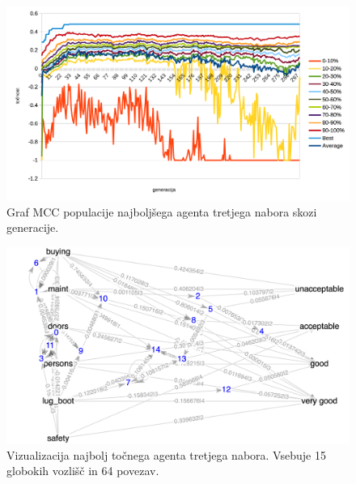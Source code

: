 \begin{figure}[H]
    \begin{center}
        \includegraphics[width=13cm]{car/3/mcc}
    \end{center}
    \caption{Graf MCC populacije najboljšega agenta tretjega nabora skozi generacije.}
    \label{fig:car_mcc_3}
\end{figure}

\begin{figure}[H]
    \begin{center}
        \includegraphics[width=13cm]{car/3/acc_g}
    \end{center}
    \caption{Vizualizacija najbolj točnega agenta tretjega nabora. Vsebuje 15 globokih vozlišč in 64 povezav.}
    \label{fig:car_acc_3_g}
\end{figure}

